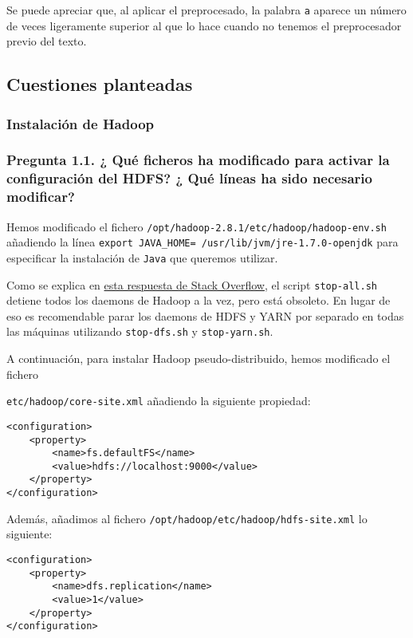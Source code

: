 \documentclass[11pt]{article}
\def\inline{\lstinline[basicstyle=\ttfamily,keywordstyle={}]}
\begin{document}
Se puede apreciar que, al aplicar el preprocesado, la palabra \inline{a} aparece un número de veces ligeramente superior al que lo hace cuando no tenemos el preprocesador previo del texto.

\subsection{ Cuestiones planteadas}

\subsubsection{ Instalación de Hadoop }

\subsubsection*{ Pregunta 1.1. ¿ Qué ficheros ha modificado para activar la configuración del HDFS? ¿ Qué líneas ha sido necesario modificar? }

Hemos modificado el fichero \inline{/opt/hadoop-2.8.1/etc/hadoop/hadoop-env.sh} añadiendo la línea \inline{export JAVA_HOME= /usr/lib/jvm/jre-1.7.0-openjdk} para especificar la instalación de \inline{Java} que queremos utilizar.

Como se explica en \href{https://stackoverflow.com/questions/17569423/what-is-best-way-to-start-and-stop-hadoop-ecosystem-with-command-line}{esta respuesta de Stack Overflow}, el script \inline{stop-all.sh} detiene todos los daemons de Hadoop a la vez, pero está obsoleto. En lugar de eso es recomendable parar los daemons de HDFS y YARN por separado en todas las máquinas utilizando \inline|stop-dfs.sh| y \inline{stop-yarn.sh}.

A continuación, para instalar Hadoop pseudo-distribuido, hemos modificado el fichero

\inline{etc/hadoop/core-site.xml} añadiendo la siguiente propiedad:

\begin{verbatim}
<configuration>
    <property>
        <name>fs.defaultFS</name>
        <value>hdfs://localhost:9000</value>
    </property>
</configuration>
\end{verbatim}

Además, añadimos al fichero \inline{/opt/hadoop/etc/hadoop/hdfs-site.xml} lo siguiente:

\begin{verbatim}
<configuration>
    <property>
        <name>dfs.replication</name>
        <value>1</value>
    </property>
</configuration>
\end{verbatim}
\end{document}
